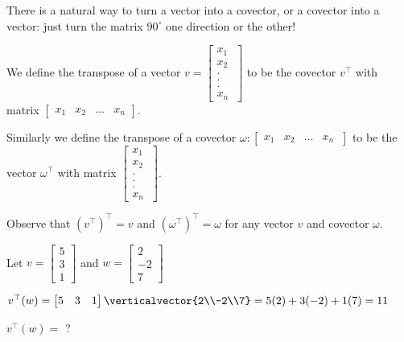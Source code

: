 There is a natural way to turn a vector into a covector, or a covector into a vector:  just turn the matrix $90^\circ$ one direction or the other!

\begin{definition}
	We define the transpose of a vector $v = \begin{bmatrix} x_1 \\x_2\\ .\\.\\. \\ x_n\ \end{bmatrix}$ to be the covector $v^\top$ with matrix 
	$\begin{bmatrix} x_1 &x_2& ... &x_n \end{bmatrix}$.
	
	Similarly we define the transpose of a covector $\omega: \begin{bmatrix} x_1 &x_2& ... &x_n\ \end{bmatrix}$ to be the vector $\omega^\top$ with matrix
	$\begin{bmatrix} x_1 \\x_2\\ .\\.\\. \\ x_n\ \end{bmatrix}$.  
\end{definition}

Observe that $(v^\top)^\top = v$ and $(\omega^\top)^\top = \omega$ for any vector $v$ and covector $\omega$.

\begin{question}
		Let $v = \begin{bmatrix}  5 \\ 3 \\ 1\end{bmatrix}$ and $w = \begin{bmatrix}  2 \\ -2 \\ 7\end{bmatrix}$ 
	\begin{solution}
	\begin{hint}
		$v^\top(w) = \begin{bmatrix} 5 & 3 & 1\end{bmatrix} \verticalvector{2\\-2\\7} = 5(2)+3(-2)+1(7) = 11$
	\end{hint}
	   $v^\top(w)=$ ?
	\end{solution}
\end{question}

